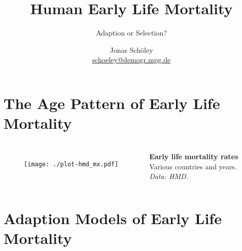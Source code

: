 \documentclass{beamer}
\title{Human Early Life Mortality}
\subtitle{Adaption or Selection?}
\author{Jonas Schöley\\\url{schoeley@demogr.mpg.de}}
\institute{\texttt{[image: ./EDSDLogo.pdf]}}
\begin{document}
{
%
\begin{frame}[plain]
\titlepage
\end{frame}
}

\section{The Age Pattern of Early Life Mortality} %


\begin{frame}
\frametitle{\insertsection}

\begin{columns}[c]

\begin{figure}[htb!]
\texttt{[image: ./plot-hmd\_mx.pdf]}\\
\end{figure}

\footnotesize\textbf{Early life mortality rates}\\ Various countries and years.\\ \scriptsize\emph{Data: HMD.}

\end{columns}

\end{frame}

\section{Adaption Models of Early Life Mortality} %
\end{document}
